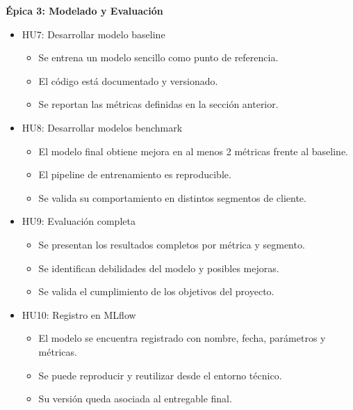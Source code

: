 \documentclass[
11pt, %
]{charter}
\begin{document}
\textbf{\'Epica 3: Modelado y Evaluación}
\begin{itemize}
  \item HU7: Desarrollar modelo baseline
  \begin{itemize}
    \item Se entrena un modelo sencillo como punto de referencia.
    \item El código está documentado y versionado.
    \item Se reportan las métricas definidas en la sección anterior.
  \end{itemize}
  \item HU8: Desarrollar modelos benchmark
  \begin{itemize}
    \item El modelo final obtiene mejora en al menos 2 métricas frente al baseline.
    \item El pipeline de entrenamiento es reproducible.
    \item Se valida su comportamiento en distintos segmentos de cliente.
  \end{itemize}
  \item HU9: Evaluación completa
  \begin{itemize}
    \item Se presentan los resultados completos por métrica y segmento.
    \item Se identifican debilidades del modelo y posibles mejoras.
    \item Se valida el cumplimiento de los objetivos del proyecto.
  \end{itemize}
  \item HU10: Registro en MLflow
  \begin{itemize}
    \item El modelo se encuentra registrado con nombre, fecha, parámetros y métricas.
    \item Se puede reproducir y reutilizar desde el entorno técnico.
    \item Su versión queda asociada al entregable final.
  \end{itemize}
\end{itemize}
\end{document}
